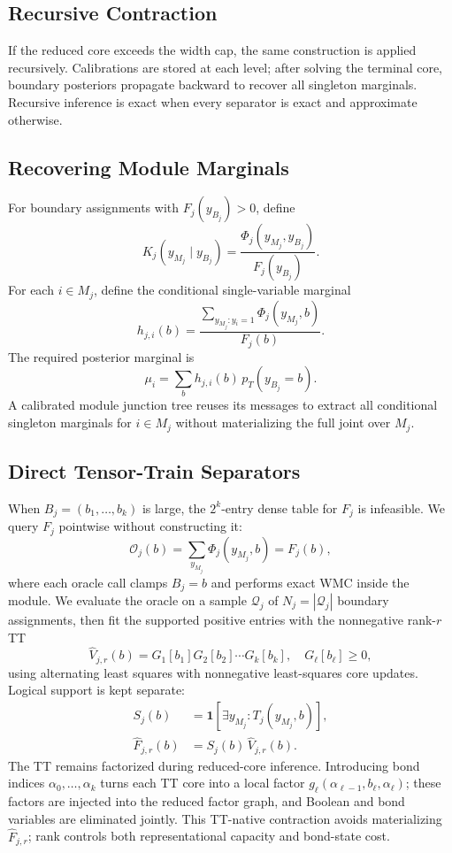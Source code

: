 \documentclass[12pt]{article}
\begin{document}
\subsection{Recursive Contraction}

If the reduced core exceeds the width cap, the same construction is
applied recursively. Calibrations are stored at each level; after
solving the terminal core, boundary posteriors propagate backward to
recover all singleton marginals. Recursive inference is exact when
every separator is exact and approximate otherwise.

\subsection{Recovering Module Marginals}

For boundary assignments with $F_j(y_{B_j})>0$, define
\[
  K_j(y_{M_j}\mid y_{B_j}) = \frac{\Phi_j(y_{M_j},y_{B_j})}{F_j(y_{B_j})}.
\]
For each $i\in M_j$, define the conditional single-variable marginal
\[
  h_{j,i}(b) = \frac{\sum_{y_{M_j}:y_i=1}\Phi_j(y_{M_j},b)}{F_j(b)}.
\]
The required posterior marginal is
\[
  \mu_i = \sum_b h_{j,i}(b)\,p_T(y_{B_j}=b).
\]
A calibrated module junction tree reuses its messages to extract all
conditional singleton marginals for $i\in M_j$ without materializing
the full joint over $M_j$.

\subsection{Direct Tensor-Train Separators}
\label{sec:tt-separator}

When $B_j=(b_1,\ldots,b_k)$ is large, the $2^k$-entry dense table for
$F_j$ is infeasible. We query $F_j$ pointwise without constructing it:
\[
  \mathcal{O}_j(b) = \sum_{y_{M_j}}\Phi_j(y_{M_j},b) = F_j(b),
\]
where each oracle call clamps $B_j=b$ and performs exact WMC inside the
module. We evaluate the oracle on a sample $\mathcal{Q}_j$ of
$N_j = |\mathcal{Q}_j|$ boundary assignments, then fit the supported
positive entries with the nonneg\-ative rank-$r$ TT
\[
  \widehat{V}_{j,r}(b) = G_1[b_1]G_2[b_2]\cdots G_k[b_k],
  \quad G_\ell[b_\ell]\geq 0,
\]
using alternating least squares with nonneg\-ative least-squares core
updates. Logical support is kept separate:
\begin{align*}
  S_j(b) &= \mathbf{1}\!\left[\exists y_{M_j}:T_j(y_{M_j},b)\right], \\
  \widehat{F}_{j,r}(b) &= S_j(b)\,\widehat{V}_{j,r}(b).
\end{align*}
The TT remains factorized during reduced-core inference. Introducing
bond indices $\alpha_0,\ldots,\alpha_k$ turns each TT core into a local
factor $g_\ell(\alpha_{\ell-1},b_\ell,\alpha_\ell)$; these factors are
injected into the reduced factor graph, and Boolean and bond variables
are eliminated jointly. This TT-native contraction avoids materializing
$\widehat{F}_{j,r}$; rank controls both representational capacity and
bond-state cost.
\end{document}
